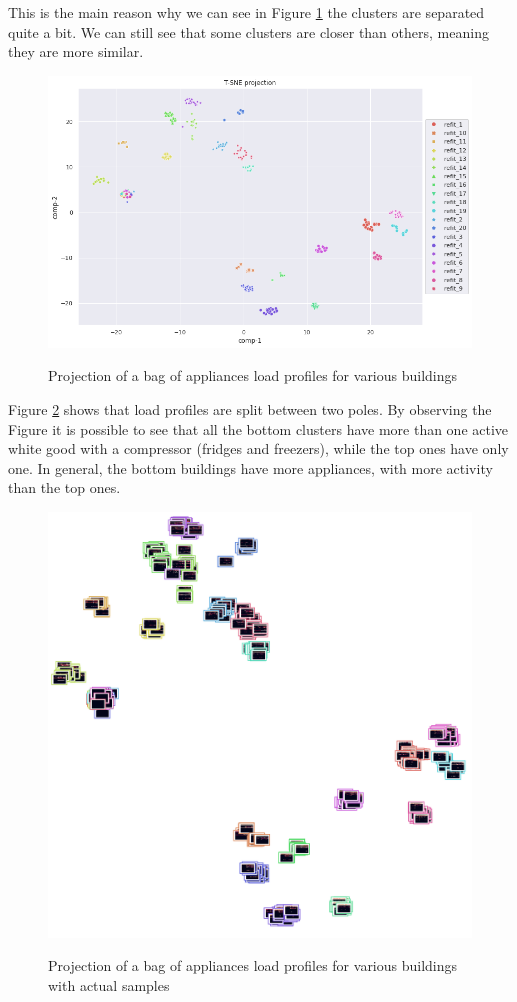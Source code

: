 This is the main reason why we can see in Figure \ref{fig:tsne_boa_scatter_refit8} the clusters are separated quite a bit.
We can still see that some clusters are closer than others,
meaning they are more similar.

\begin{figure}[H]
	\centering
	\caption{Projection of a bag of appliances load profiles for various buildings}
	\includegraphics[width=.8\textwidth]{Figures/TSNE/TSNE_BOA/refit/scatter_refit_all.png}
	\label{fig:tsne_boa_scatter_refit8}
\end{figure}

Figure \ref{fig:tsne_boa_img_scatter_refit8} shows that load profiles are split 
between two poles. 
By observing the Figure it is possible to see that all the bottom clusters
have more than one active white good with a compressor (fridges and freezers), while
the top ones have only one. In general, the bottom buildings have more appliances,
with more activity than the top ones. 

\begin{figure}[H]
	\centering
	\caption{Projection of a bag of appliances load profiles for various buildings with actual samples}
	\includegraphics[width=.9\textwidth]{Figures/TSNE/TSNE_BOA/refit/img_scatter_refitall.png}
	\label{fig:tsne_boa_img_scatter_refit8}
\end{figure}

